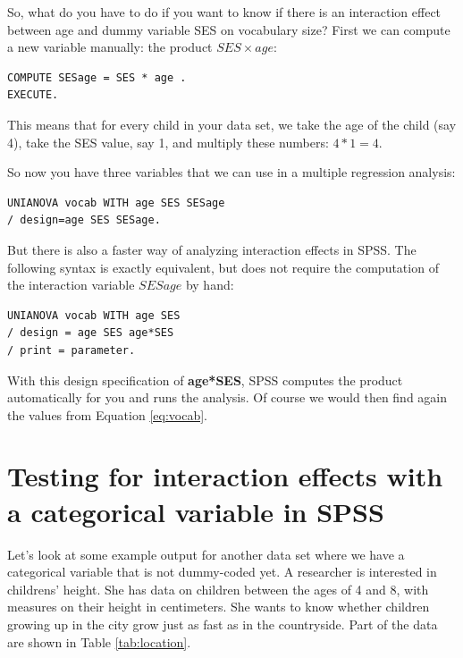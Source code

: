 \documentclass[]{report}\usepackage[]{graphicx}\usepackage[]{color}
\begin{document}
So, what do you have to do if you want to know if there is an interaction effect between age and dummy variable SES on vocabulary size?  First we can compute a new variable manually: the product $SES \times age$:


\begin{verbatim}
COMPUTE SESage = SES * age .
EXECUTE.
\end{verbatim}

This means that for every child in your data set, we take the age of the child (say 4), take the SES value, say 1, and multiply these numbers: $4*1=4$.


So now you have three variables that we can use in a multiple regression analysis:

\begin{verbatim}
UNIANOVA vocab WITH age SES SESage
/ design=age SES SESage.
\end{verbatim}


But there is also a faster way of analyzing interaction effects in SPSS. The following syntax is exactly equivalent, but does not require the computation of the interaction variable $SESage$ by hand:

\begin{verbatim}
UNIANOVA vocab WITH age SES 
/ design = age SES age*SES
/ print = parameter.
\end{verbatim}

With this design specification of \textbf{age*SES}, SPSS computes the product automatically for you and runs the analysis. Of course we would then find again the values from Equation \ref{eq:vocab}.



\section{Testing for interaction effects with a categorical variable in SPSS}


Let's look at some example output for another data set where we have a categorical variable that is not dummy-coded yet. A researcher is interested in childrens' height. She has data on children between the ages of 4 and 8, with measures on their height in centimeters. She wants to know whether children growing up in the city grow just as fast as in the countryside. Part of the data are shown in Table \ref{tab:location}.
 
 
 
\end{document}
